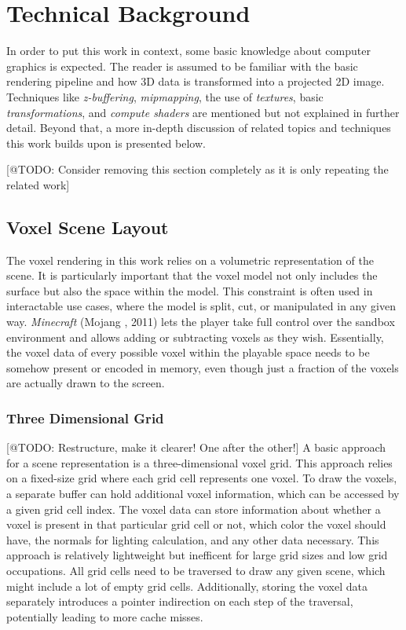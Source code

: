\chapter{Technical Background} \label{cpt-technical-background}

In order to put this work in context, some basic knowledge about computer graphics is expected.
The reader is assumed to be familiar with the basic rendering pipeline and how 3D data is 
transformed into a projected 2D image. Techniques like \emph{z-buffering}, \emph{mipmapping}, 
the use of \emph{textures}, basic \emph{transformations}, and \emph{compute shaders} are mentioned 
but not explained in further detail. Beyond that, a more in-depth discussion of related topics and 
techniques this work builds upon is presented below.

[@TODO: Consider removing this section completely as it is only repeating the related work]

\section{Voxel Scene Layout} \label{sec-voxel-scene-layout}

The voxel rendering in this work relies on a volumetric representation of the scene.
It is particularly important that the voxel model not only includes the surface but also 
the space within the model. This constraint is often used in interactable use cases, where 
the model is split, cut, or manipulated in any given way. \emph{Minecraft} (Mojang \cite{Mojang2024}, 
2011) lets the player take full control over the sandbox environment and allows adding or 
subtracting voxels as they wish. Essentially, the voxel data of every possible voxel within 
the playable space needs to be somehow present or encoded in memory, even though just a 
fraction of the voxels are actually drawn to the screen.


\subsection*{Three Dimensional Grid} \label{subsec-three-dimensional-grid}

[@TODO: Restructure, make it clearer! One after the other!]
A basic approach for a scene representation is a three-dimensional voxel grid. This 
approach relies on a fixed-size grid where each grid cell represents one voxel.
To draw the voxels, a separate buffer can hold additional voxel information, which 
can be accessed by a given grid cell index. The voxel data can store information about 
whether a voxel is present in that particular grid cell or not, which color the voxel 
should have, the normals for lighting calculation, and any other data necessary.
This approach is relatively lightweight but inefficent for large grid sizes and low 
grid occupations. All grid cells need to be traversed to draw any given scene, which 
might include a lot of empty grid cells. Additionally, storing the voxel data separately
introduces a pointer indirection on each step of the traversal, potentially leading to more 
cache misses.


